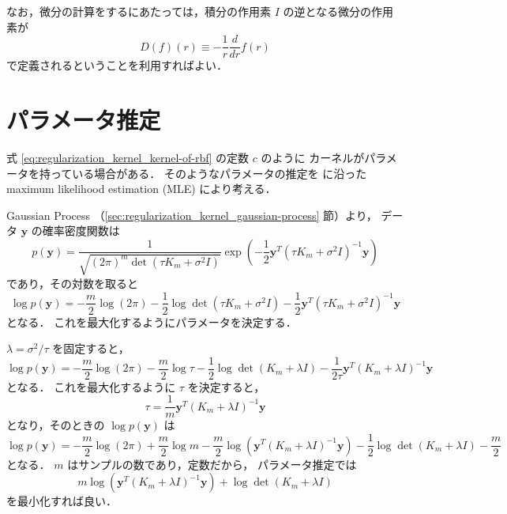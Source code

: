 なお，微分の計算をするにあたっては，積分の作用素 $I$ の逆となる微分の作用素が
\begin{equation}
    D(f)(r) \equiv -\frac{1}{r} \frac{d}{dr} f(r)
\end{equation}
で定義されるということを利用すればよい．

\section{パラメータ推定}\label{sec:regularization_kernel_param-est}

式 \eqref{eq:regularization_kernel_kernel-of-rbf} の定数 $c$ のように
カーネルがパラメータを持っている場合がある．
そのようなパラメータの推定を
\cite[Remark 3 (Connection to spatial statistics)]{Scheuerer2011}
に沿った
maximum likelihood estimation (MLE)
により考える．

Gaussian Process （\ref{sec:regularization_kernel_gaussian-process} 節）より，
データ $\bm{y}$ の確率密度関数は
\begin{equation}
    p(\bm{y}) = \frac{1}{\sqrt{(2\pi)^{m} \det(\tau K_m + \sigma^2 I)}}
    \exp\left(-\frac{1}{2} \bm{y}^T (\tau K_m + \sigma^2 I)^{-1} \bm{y} \right)
\end{equation}
であり，その対数を取ると
\begin{equation}
    \log{p(\bm{y})}
    = -\frac{m}{2}\log(2\pi)
    - \frac{1}{2} \log{\det(\tau K_m + \sigma^2 I)}
    - \frac{1}{2} \bm{y}^T (\tau K_m + \sigma^2 I)^{-1} \bm{y}
\end{equation}
となる．
これを最大化するようにパラメータを決定する．

$\lambda = \sigma^2 / \tau$ を固定すると，
\begin{equation}
    \log{p(\bm{y})}
    = -\frac{m}{2}\log(2\pi)
    - \frac{m}{2} \log{\tau}
    - \frac{1}{2} \log{\det(K_m + \lambda I)}
    - \frac{1}{2\tau} \bm{y}^T (K_m + \lambda I)^{-1} \bm{y}
\end{equation}
となる．
これを最大化するように $\tau$ を決定すると，
\begin{equation}
    \tau = \frac{1}{m} \bm{y}^T (K_m + \lambda I)^{-1} \bm{y}
    \label{eq:interp_kernel_param_coeff_tau}
\end{equation}
となり，そのときの $\log{p(\bm{y})}$ は
\begin{equation}
    \log{p(\bm{y})}
    = -\frac{m}{2}\log(2\pi)
    + \frac{m}{2} \log{m}
    - \frac{m}{2} \log(\bm{y}^T (K_m + \lambda I)^{-1} \bm{y})
    - \frac{1}{2} \log{\det(K_m + \lambda I)}
    - \frac{m}{2}
\end{equation}
となる．
$m$ はサンプルの数であり，定数だから，
パラメータ推定では
\begin{equation}
    m \log(\bm{y}^T (K_m + \lambda I)^{-1} \bm{y})
    + \log{\det(K_m + \lambda I)}
\end{equation}
を最小化すれば良い．

